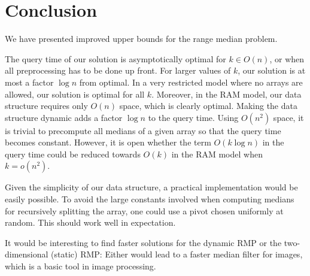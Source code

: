 \documentclass[a4paper,10pt]{article}
\begin{document}
\section{Conclusion}\label{s:conclusions}



We have presented improved upper bounds for the range median problem. 

The query time of  our solution is asymptotically optimal for $k \in O(n)$, or when all preprocessing has to be done up front.
For larger values of $k$, our solution is at most a factor $\log n$ from optimal. In a very restricted model where no arrays are allowed, our solution is optimal for all $k$. Moreover, in the RAM model, our data structure requires only $O(n)$ space, which is clearly optimal. Making the data structure dynamic adds a factor $\log n$  to the query time.
Using $O(n^2)$ space, it is trivial to precompute all medians of a given array so that the query time
becomes constant. However, it is open whether the term $O(k \log n)$ in the query time could be reduced towards $O(k)$ in the RAM model when $k=o(n^2)$.

Given the simplicity of our data structure, a practical implementation would be easily possible.
To avoid the large constants involved when computing medians for recursively splitting the array,
one could use a pivot chosen uniformly at random. This should work  well in expectation.

It would be interesting to find faster solutions for the dynamic RMP or the two-dimensional (static) RMP:
Either would lead to a faster median filter for images, which is a basic tool in image processing.





\end{document}
